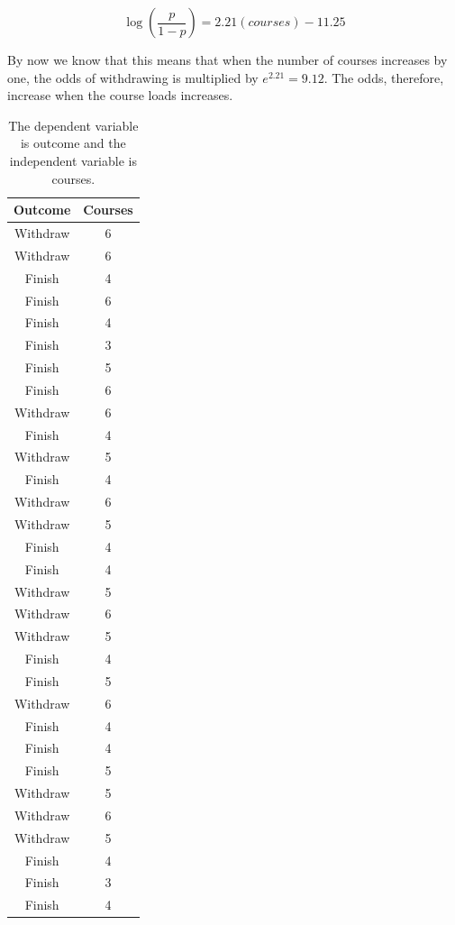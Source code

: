 \documentclass[a4paper,12pt,oneside]{book}
\begin{document}
$$ \log(\frac{p}{1-p})=2.21(courses)-11.25 $$

By now we know that this means that when the number of courses increases by one, the odds of withdrawing is multiplied by $e^{2.21}=9.12$. The odds, therefore, increase when the course loads increases.
\begin{longtable}[c]{ c c }
	\caption{The dependent variable is outcome and the independent variable is courses.\label{table:goodnessoffit}}\\
		\hline
		\bf Outcome & \bf Courses \\
		\hline
		Withdraw & 6 \\
		Withdraw & 6 \\
		Finish & 4 \\
		Finish & 6 \\
		Finish & 4 \\
		Finish & 3 \\
		Finish & 5 \\
		Finish & 6 \\
		Withdraw & 6 \\
		Finish & 4 \\
		Withdraw & 5 \\
		Finish & 4 \\
		Withdraw & 6 \\
		Withdraw & 5 \\
		Finish & 4 \\
		Finish & 4 \\
		Withdraw & 5 \\
		Withdraw & 6 \\
		Withdraw & 5 \\
		Finish & 4 \\
		Finish & 5 \\
		Withdraw & 6 \\
		Finish & 4 \\
		Finish & 4 \\
		Finish & 5 \\
		Withdraw & 5 \\
		Withdraw & 6 \\
		Withdraw & 5 \\
		Finish & 4 \\
		Finish & 3 \\
		Finish & 4 \\
	\hline
\end{longtable}
\end{document}
